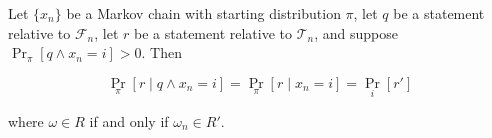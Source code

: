 Let $\{x_n\}$ be a Markov chain with starting distribution $\pi$, let $q$ be a statement relative to $\mathcal{F}_n$, let $r$ be a statement relative to $\mathcal{T}_n$, and suppose $\Pr_\pi[q \land x_n = i] > 0$. Then

$$\Pr_\pi[r \mid q \land x_n = i] = \Pr_\pi[r \mid x_n = i] = \Pr_i[r']$$

where $\omega \in R$ if and only if $\omega_n \in R'$.
